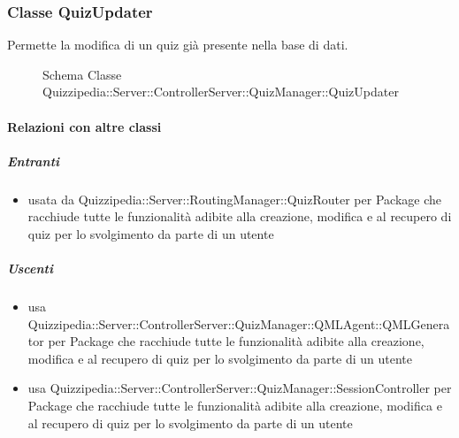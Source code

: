 \subsubsection{Classe QuizUpdater}
Permette la modifica di un quiz già presente nella base di dati.
\begin{figure}[H]
\centering
\noindent{}
\caption[Schema Classe QuizUpdater]{Schema Classe Quizzipedia::Server::ControllerServer::QuizManager::QuizUpdater}
\end{figure}
\paragraph{Relazioni con altre classi}
\subparagraph{Entranti}
\begin{itemize}
\item usata da Quizzipedia::Server::RoutingManager::QuizRouter per Package che racchiude tutte le funzionalità adibite alla creazione, modifica e al recupero di quiz per lo svolgimento da parte di un utente
\end{itemize}
\subparagraph{Uscenti}
\begin{itemize}
\item usa Quizzipedia::Server::ControllerServer::QuizManager::QMLAgent::QMLGenerator per Package che racchiude tutte le funzionalità adibite alla creazione, modifica e al recupero di quiz per lo svolgimento da parte di un utente
\item usa Quizzipedia::Server::ControllerServer::QuizManager::SessionController per Package che racchiude tutte le funzionalità adibite alla creazione, modifica e al recupero di quiz per lo svolgimento da parte di un utente
\end{itemize}

